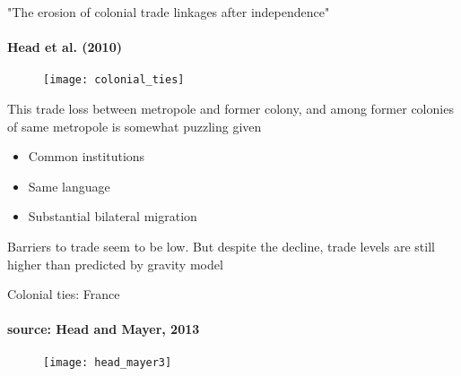 \documentclass{beamer}
\begin{document}
\begin{frame}{"The erosion of colonial trade linkages after independence"}
\framesubtitle{Head et al. (2010)}
  \begin{figure}\centering
    \texttt{[image: colonial\_ties]}
  \end{figure}
\end{frame}

\begin{frame}
  This trade loss between metropole and former colony, and among former colonies of same metropole is somewhat puzzling given
  \begin{itemize}
    \item Common institutions
    \item Same language
    \item Substantial bilateral migration
  \end{itemize}
  \medskip
  Barriers to trade seem to be low. 
  But despite the decline, trade levels are still higher than predicted by gravity model
\end{frame}

\begin{frame}{Colonial ties: France}
\framesubtitle{source: Head and Mayer, 2013}
  \begin{figure}
    \texttt{[image: head\_mayer3]}
  \end{figure}
\end{frame}

\end{document}

